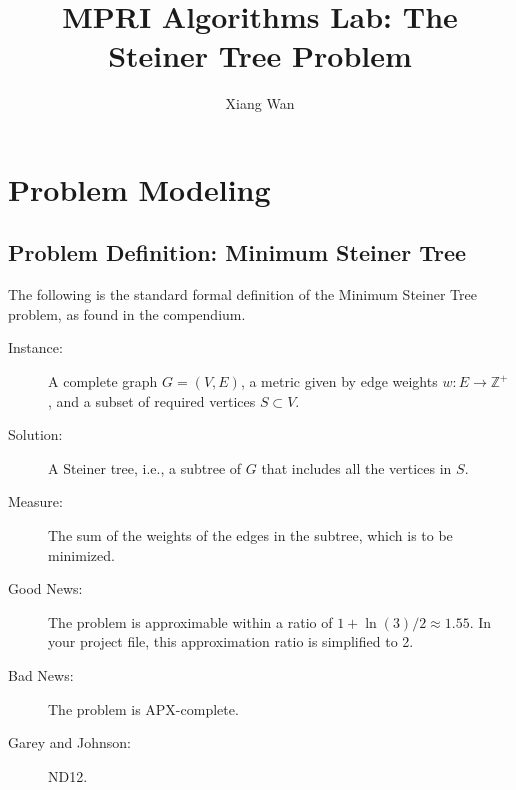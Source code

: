\documentclass{article}
\title{MPRI Algorithms Lab: The Steiner Tree Problem}
\author{Xiang Wan}
\begin{document}
\maketitle %

\section{Problem Modeling}

\subsection{Problem Definition: Minimum Steiner Tree}
\label{sec:problem_definition_en}

The following is the standard formal definition of the Minimum Steiner Tree problem, as found in the compendium.

\begin{description}
    \item[Instance:] 
    A complete graph $G=(V,E)$, a metric given by edge weights $w: E \to \mathbb{Z}^+$, and a subset of required vertices $S \subset V$.

    \item[Solution:] 
    A Steiner tree, i.e., a subtree of $G$ that includes all the vertices in $S$.

    \item[Measure:] 
    The sum of the weights of the edges in the subtree, which is to be minimized.

    \item[Good News:] 
    The problem is approximable within a ratio of $1+\ln(3)/2 \approx 1.55$. In your project file, this approximation ratio is simplified to 2.

    \item[Bad News:] 
    The problem is APX-complete.

    
    \item[Garey and Johnson:] ND12.

\end{description}


\end{document}
